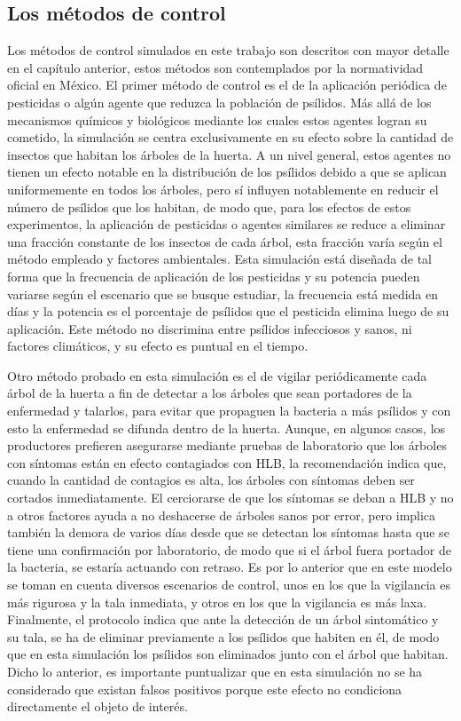 \subsection{Los métodos de control}
Los métodos de control simulados en este trabajo son descritos con mayor detalle en el capítulo anterior, estos métodos son contemplados por la normatividad oficial en México. El primer método de control es el de la aplicación periódica de pesticidas o algún agente que reduzca la población de psílidos. Más allá de los mecanismos químicos y biológicos mediante los cuales estos agentes logran su cometido, la simulación se centra exclusivamente en su efecto sobre la cantidad de insectos que habitan los árboles de la huerta. A un nivel general, estos agentes no tienen un efecto notable en la distribución de los psílidos debido a que se aplican uniformemente en todos los árboles, pero sí influyen notablemente en reducir el número de psílidos que los habitan, de modo que, para los efectos de estos experimentos, la aplicación de pesticidas o agentes similares se reduce a eliminar una fracción constante de los insectos de cada árbol, esta fracción varía según el método empleado y factores ambientales. Esta simulación está diseñada de tal forma que la frecuencia de aplicación de los pesticidas y su potencia pueden variarse según el escenario que se busque estudiar, la frecuencia está medida en días y la potencia es el porcentaje de psílidos que el pesticida elimina luego de su aplicación. Este método no discrimina entre psílidos infecciosos y sanos, ni factores climáticos, y su efecto es puntual en el tiempo.

Otro método probado en esta simulación es el de vigilar periódicamente cada árbol de la huerta a fin de detectar a los árboles que sean portadores de la enfermedad y talarlos, para evitar que propaguen la bacteria a más psílidos y con esto la enfermedad se difunda dentro de la huerta. Aunque, en algunos casos, los productores prefieren asegurarse mediante pruebas de laboratorio que los árboles con síntomas están en efecto contagiados con HLB, la recomendación indica que, cuando la cantidad de contagios es alta, los árboles con síntomas deben ser cortados inmediatamente\cite{robles2012protocolo}. El cerciorarse de que los síntomas se deban a HLB y no a otros factores ayuda a no deshacerse de árboles sanos por error, pero implica también la demora de varios días desde que se detectan los síntomas hasta que se tiene una confirmación por laboratorio, de modo que si el árbol fuera portador de la bacteria, se estaría actuando con retraso. Es por lo anterior que en este modelo se toman en cuenta diversos escenarios de control, unos en los que la vigilancia es más rigurosa y la tala inmediata, y otros en los que la vigilancia es más laxa. Finalmente, el protocolo indica que ante la detección de un árbol sintomático y su tala, se ha de eliminar previamente a los psílidos que habiten en él, de modo que en esta simulación los psílidos son eliminados junto con el árbol que habitan. Dicho lo anterior, es importante puntualizar que en esta simulación no se ha considerado que existan falsos positivos porque este efecto no condiciona directamente el objeto de interés.


